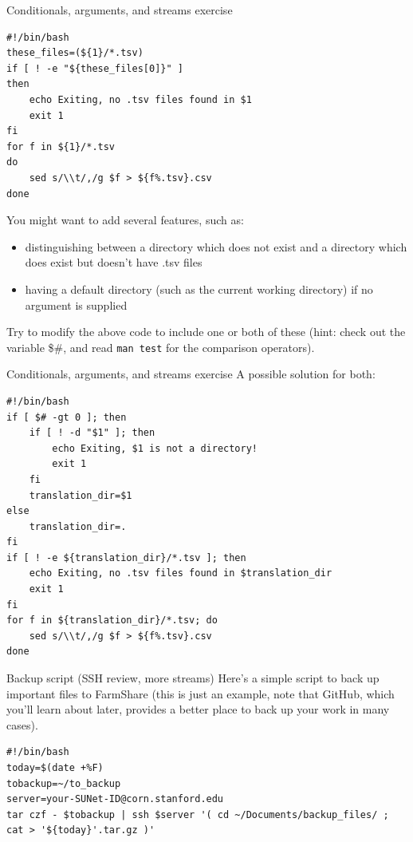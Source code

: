 \documentclass{beamer}
\begin{document}
\begin{frame}[fragile]{Conditionals, arguments, and streams exercise}
\begin{lstlisting}[basicstyle=\small]
#!/bin/bash
these_files=(${1}/*.tsv)
if [ ! -e "${these_files[0]}" ]
then
    echo Exiting, no .tsv files found in $1
    exit 1
fi 
for f in ${1}/*.tsv
do
    sed s/\\t/,/g $f > ${f%.tsv}.csv
done
\end{lstlisting}
You might want to add several features, such as: 
\begin{itemize}
\item distinguishing between a directory which does not exist and a directory which does exist but doesn't have .tsv files
\item having a default directory (such as the current working directory) if no argument is supplied
\end{itemize}
Try to modify the above code to include one or both of these (hint: check out the variable \$\#, and read \lstinline|man test| for the comparison operators). 
\end{frame}

\begin{frame}[fragile]{Conditionals, arguments, and streams exercise}
A possible solution for both:
\begin{lstlisting}[basicstyle=\small]
#!/bin/bash
if [ $# -gt 0 ]; then
    if [ ! -d "$1" ]; then
        echo Exiting, $1 is not a directory!
        exit 1
    fi
    translation_dir=$1
else
    translation_dir=.
fi
if [ ! -e ${translation_dir}/*.tsv ]; then
    echo Exiting, no .tsv files found in $translation_dir
    exit 1
fi 
for f in ${translation_dir}/*.tsv; do
    sed s/\\t/,/g $f > ${f%.tsv}.csv
done
\end{lstlisting}
\end{frame}

\begin{frame}[fragile]{Backup script (SSH review, more streams)}
Here's a simple script to back up important files to FarmShare (this is just an example, note that GitHub, which you'll learn about later, provides a better place to back up your work in many cases). 
\begin{lstlisting}[title=backup.sh]
#!/bin/bash
today=$(date +%F)
tobackup=~/to_backup
server=your-SUNet-ID@corn.stanford.edu
tar czf - $tobackup | ssh $server '( cd ~/Documents/backup_files/ ; cat > '${today}'.tar.gz )'
\end{lstlisting}
\end{frame}
\end{document}
